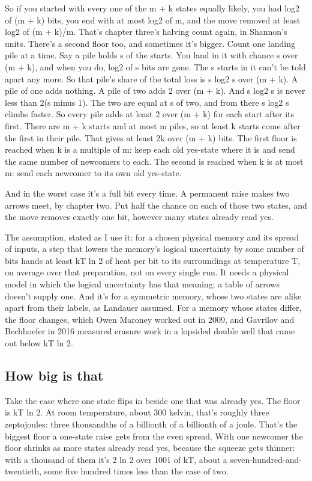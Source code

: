 \documentclass[11pt,twoside]{article}
\theoremstyle{thielethm}
\theoremstyle{thieledef}
\theoremstyle{thieledef}
\theoremstyle{thieledef}
\theoremstyle{thielethm}
\theoremstyle{thieleobs}
\theoremstyle{thielethm}
\begin{document}
So if you started with every one of the m + k states equally likely, you had log2 of (m + k) bits, you end with at most log2 of m, and the move removed at least log2 of (m + k)/m. That's chapter three's halving count again, in Shannon's units. There's a second floor too, and sometimes it's bigger. Count one landing pile at a time. Say a pile holds s of the starts. You land in it with chance s over (m + k), and when you do, log2 of s bits are gone. The s starts in it can't be told apart any more. So that pile's share of the total loss is s log2 s over (m + k). A pile of one adds nothing. A pile of two adds 2 over (m + k). And s log2 s is never less than 2(s minus 1). The two are equal at s of two, and from there s log2 s climbs faster. So every pile adds at least 2 over (m + k) for each start after its first. There are m + k starts and at most m piles, so at least k starts come after the first in their pile. That gives at least 2k over (m + k) bits. The first floor is reached when k is a multiple of m: keep each old yes-state where it is and send the same number of newcomers to each. The second is reached when k is at most m: send each newcomer to its own old yes-state.

And in the worst case it's a full bit every time. A permanent raise makes two arrows meet, by chapter two. Put half the chance on each of those two states, and the move removes exactly one bit, however many states already read yes.

The assumption, stated as I use it: for a chosen physical memory and its spread of inputs, a step that lowers the memory's logical uncertainty by some number of bits hands at least kT ln 2 of heat per bit to its surroundings at temperature T, on average over that preparation, not on every single run. It needs a physical model in which the logical uncertainty has that meaning; a table of arrows doesn't supply one. And it's for a symmetric memory, whose two states are alike apart from their labels, as Landauer assumed. For a memory whose states differ, the floor changes, which Owen Maroney worked out in 2009, and Gavrilov and Bechhoefer in 2016 measured erasure work in a lopsided double well that came out below kT ln 2.

\subsection{How big is that}

Take the case where one state flips in beside one that was already yes. The floor is kT ln 2. At room temperature, about 300 kelvin, that's roughly three zeptojoules: three thousandths of a billionth of a billionth of a joule. That's the biggest floor a one-state raise gets from the even spread. With one newcomer the floor shrinks as more states already read yes, because the squeeze gets thinner: with a thousand of them it's 2 ln 2 over 1001 of kT, about a seven-hundred-and-twentieth, some five hundred times less than the case of two.
\end{document}
